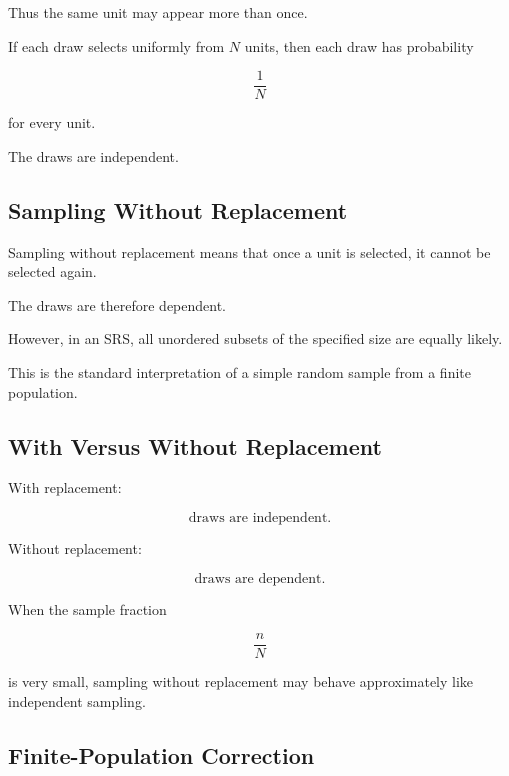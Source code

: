 Thus the same unit may appear more than once.

If each draw selects uniformly from \(N\) units, then each draw has
probability

\[
\boxed{
\frac1N
}
\]

for every unit.

The draws are independent.

\subsection{Sampling Without Replacement}
\label{subsec:sampling-without-replacement}

Sampling without replacement means that once a unit is selected, it
cannot be selected again.

The draws are therefore dependent.

However, in an SRS, all unordered subsets of the specified size are
equally likely.

This is the standard interpretation of a simple random sample from a
finite population.

\subsection{With Versus Without Replacement}
\label{subsec:with-versus-without-replacement}

With replacement:

\[
\boxed{
\text{draws are independent}.
}
\]

Without replacement:

\[
\boxed{
\text{draws are dependent}.
}
\]

When the sample fraction

\[
\frac nN
\]

is very small, sampling without replacement may behave approximately like
independent sampling.

\subsection{Finite-Population Correction}
\label{subsec:finite-population-correction}

